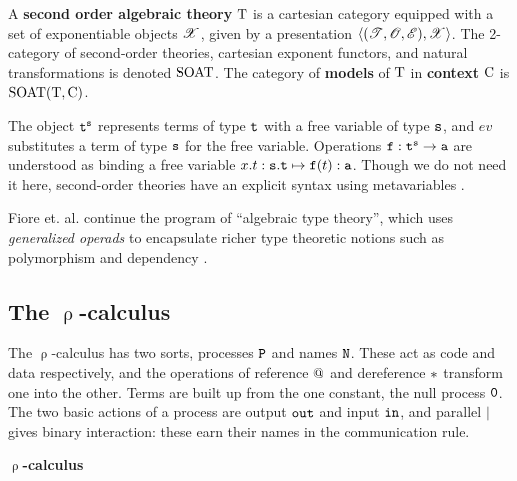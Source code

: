 \documentclass[stthol.tex]{subfiles}
\begin{document}
\begin{definition}
  A \textbf{second order algebraic theory} $\mathrm{T}$ is a cartesian category equipped with a set of exponentiable objects $\mathscr{X}$, given by a presentation $\langle (\mathscr{T},\mathscr{O},\mathscr{E}),\mathscr{X} \rangle$. The 2-category of second-order theories, cartesian exponent functors, and natural transformations is denoted $\mathrm{SOAT}$. The category of \textbf{models} of $\mathrm{T}$ in \textbf{context} $\mathrm{C}$ is $\mathrm{SOAT}(\mathrm{T},\mathrm{C})$.
\end{definition}

The object $\mathtt{t}^{\mathtt{s}}$ represents terms of type $\mathtt{t}$ with a free variable of type $\mathtt{s}$, and $ev$ substitutes a term of type $\mathtt{s}$ for the free variable. Operations $\mathtt{f}:\mathtt{t}^{\mathtt{s}}\to \mathtt{a}$ are understood as binding a free variable $x.t:\mathtt{s}.\mathtt{t} \mapsto \mathtt{f}(t):\mathtt{a}$. Though we do not need it here, second-order theories have an explicit syntax using metavariables \cite{soats}.


Fiore et. al. continue the program of ``algebraic type theory'', which uses \textit{generalized operads} \cite{genop} to encapsulate richer type theoretic notions such as polymorphism \cite{polythy} and dependency \cite{depthy}.

\subsection{The $\uprho$-calculus}
\label{ssec:rho}

The $\uprho$-calculus \cite{rhocal} has two sorts, processes $\mathtt{P}$ and names $\mathtt{N}$. These act as code and data respectively, and the operations of reference $\mathtt{@}$ and dereference $\mathtt{\ast}$ transform one into the other. Terms are built up from the one constant, the null process $\mathtt{0}$. The two basic actions of a process are output $\mathtt{out}$ and input $\mathtt{in}$, and parallel $\vert$ gives binary interaction: these earn their names in the communication rule.

\begin{definition}
\textbf{$\uprho$-calculus}
\end{definition}
\end{document}
